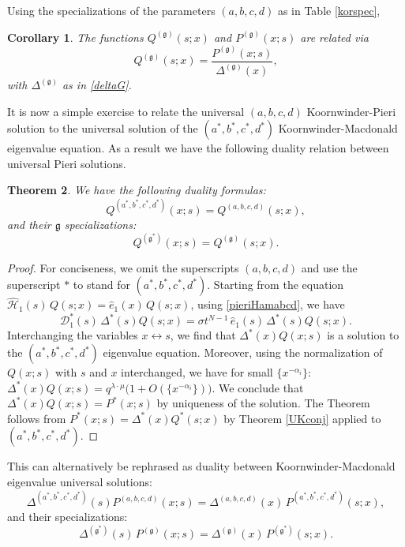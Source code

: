 \documentclass[12pt]{amsart}
\newtheorem{thm}{Theorem}[section]
\newtheorem{cor}[thm]{Corollary}
\newcommand{\g}{{\mathfrak{g}}}
\newcommand{\al}{{\alpha}}
\numberwithin{equation}{section}
\begin{document}
Using the specializations of the parameters $(a,b,c,d)$ as in Table \ref{korspec},
\begin{cor}\label{UGconj}
The functions $Q^{(\g)}(s;x)$ and $P^{(\g)}(x;s)$ 
%
%
are related via
\begin{equation} \label{DUoneG}
Q^{(\g)}(s;x)=\frac{P^{(\g)}(x;s)}{\Delta^{(\g)}(x)},
\end{equation}
with $\Delta^{(\g)}$ as in \eqref{deltaG}.
\end{cor}


%
It is now a simple exercise to relate the universal $(a,b,c,d)$ Koornwinder-Pieri solution to the universal 
solution of the $(a^*,b^*,c^*,d^*)$ Koornwinder-Macdonald eigenvalue equation. As a result we have the following duality relation between universal  Pieri solutions.

%
%
%
%

\begin{thm}\label{DUAthm}
We have the following duality formulas:
\begin{equation} Q^{(a^*,b^*,c^*,d^*)}(x;s)=Q^{(a,b,c,d)}(s;x), \label{dUabcdthm1}\end{equation}
and their $\g$ specializations:
\begin{equation}Q^{(\g^*)}(x;s)=Q^{(\g)}(s;x). \label{dUathm1}\end{equation}
\end{thm}
\begin{proof} For conciseness, we omit the superscripts $(a,b,c,d)$ and use the superscript $*$ to stand for $(a^*,b^*,c^*,d^*)$. Starting from the equation $\hat {\mathcal H}_1(s)\,Q(s;x)=\hat e_1(x)\, Q(s;x)$, using \eqref{pieriHamabcd}, we have
$${\mathcal D}_1^*(s) \, \Delta^*(s)Q(s;x)=\sigma t^{N-1}\, \hat e_1(s)\, \Delta^*(s)Q(s;x). $$
Interchanging the variables $x\leftrightarrow s$, we find that $\Delta^*(x)Q(x;s)$ is a solution to the
$(a^*,b^*,c^*,d^*)$ eigenvalue equation. Moreover, using the normalization of 
$Q(x;s)$ with $s$ and $x$ interchanged, we have for small
$\{x^{-\al_i}\}$: $\Delta^*(x)Q(x;s)=q^{\lambda\cdot\mu}\big(1+O(\{x^{-\al_i}\})\big)$. We conclude that 
$\Delta^*(x)Q(x;s)=P^*(x;s)$ by uniqueness of the solution. The Theorem follows from
$P^*(x;s)=\Delta^*(x)Q^*(s;x)$ by Theorem \ref{UKconj} applied to $(a^*,b^*,c^*,d^*)$.
\end{proof}

This can alternatively be rephrased as duality between Koornwinder-Macdonald eigenvalue universal solutions:
\begin{equation} \Delta^{(a^*,b^*,c^*,d^*)}(s) P^{(a,b,c,d)}(x;s)=\Delta^{(a,b,c,d)}(x)\, P^{(a^*,b^*,c^*,d^*)}(s;x), \label{dUabcdthm2}\end{equation}
and their specializations:
\begin{equation}\Delta^{(\g^*)}(s)\, P^{(\g)}(x;s)=\Delta^{(\g)}(x)\,P^{(\g^*)}(s;x). \label{dUathm2}\end{equation}
\end{document}
